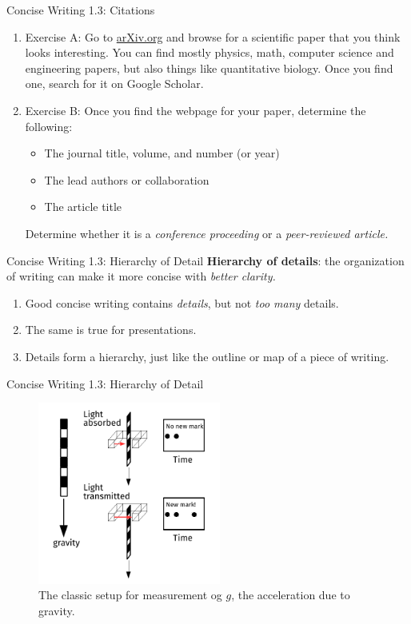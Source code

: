 \documentclass{beamer}
\begin{document}
\begin{frame}{Concise Writing 1.3: Citations}
\begin{enumerate}
\item Exercise A: Go to \url{arXiv.org} and browse for a scientific paper that you think looks interesting.  You can find mostly physics, math, computer science and engineering papers, but also things like quantitative biology.  Once you find one, search for it on Google Scholar.
\item Exercise B: Once you find the webpage for your paper, determine the following: 
\begin{itemize}
\item The journal title, volume, and number (or year)
\item The lead authors or collaboration
\item The article title
\end{itemize}
Determine whether it is a \textit{conference proceeding} or a \textit{peer-reviewed article.}
\end{enumerate}
\end{frame}

\begin{frame}{Concise Writing 1.3: Hierarchy of Detail}
\alert{\textbf{Hierarchy of details}}: the organization of writing can make it more concise with \textit{better clarity.}
\begin{enumerate}
\item Good concise writing contains \textit{details}, but not \textit{too many} details.
\item The same is true for presentations.
\item Details form a hierarchy, just like the outline or map of a piece of writing.
\end{enumerate}
\end{frame}

\begin{frame}{Concise Writing 1.3: Hierarchy of Detail}
\begin{figure}
\includegraphics[width=6cm]{figures/PicketG.pdf}
\caption{\label{fig:picket} The classic setup for measurement og $g$, the acceleration due to gravity.}
\end{figure}
\end{frame}
\end{document}
